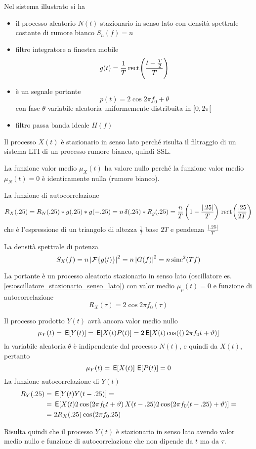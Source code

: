 Nel sistema illustrato si ha
\begin{itemize}
\item il processo aleatorio $N(t)$ stazionario in senso lato con densità spettrale costante di rumore bianco $S_n(f)=n$
\item filtro integratore a finestra mobile
\[g(t)=\frac{1}{T}\,{\operatorname{rect}}^{}\!\left({\frac{t-\frac{T}{2}}{T}}\right)\]
\item è un segnale portante 
\[p(t)=2\cos{2\pi f_0+\theta}\]
con fase $\theta$ variabile aleatoria uniformemente distribuita in $[0,2\pi[$
\item filtro passa banda ideale $H(f)$
\end{itemize}

Il processo $X(t)$ è stazionario in senso lato perché risulta il filtraggio di un sistema LTI di un processo rumore bianco, quindi SSL. 

La funzione valor medio $\mu_X(t)$ ha valore nullo perché la funzione valor medio $\mu_N(t)=0$ è identicamente nulla (rumore bianco).

La funzione di autocorrelazione \[R_X(.25)=R_N(.25)\ast g(.25)\ast g(-.25)=n\operatorname{\delta}(.25)\ast R_g(.25)= \frac{n}{T}\left(1-\frac{\left|{.25}\right|}{T}\right)\,{\operatorname{rect}}^{}\!\left({\frac{.25}{2T}}\right)\]
che è l'espressione di un triangolo di altezza $\frac{1}{T}$ base $2T$ e pendenza $\frac{\left|{.25}\right|}{T}$

La densità spettrale di potenza
\[S_X(f)=n \left|{\operatorname{\mathcal{F}}\!\left\lbrace{g(t)}\right\rbrace}\right|^2=n\left|{G(f)}\right|^2=n\operatorname{sinc}^2(T f)\]

La portante è un processo aleatorio stazionario in senso lato (oscillatore es.\ref{es:oscillatore_stazionario_senso_lato}) con valor medio $\mu_p(t)=0$ e funzione di autocorrelazione 
\[R_X(\tau)=2\cos{2\pi f_0(\tau)}\]

Il processo prodotto $Y(t)$ avrà ancora valor medio nullo
\[\mu_Y(t)=\,{\operatorname{\mathsf{E}}}\!\left[{Y(t)}\right]=\,{\operatorname{\mathsf{E}}}\!\left[{X(t)P(t)}\right]=2 \,{\operatorname{\mathsf{E}}}\!\left[{X(t)\,{\operatorname{cos}}^{}\!\left({(}\right)2\pi f_0 t+\vartheta)}\right]\]
la variabile aleatoria $\theta$ è indipendente dal processo $N(t)$, e quindi da $X(t)$, pertanto
\[\mu_Y(t)=\,{\operatorname{\mathsf{E}}}\!\left[{X(t)}\right]\,{\operatorname{\mathsf{E}}}\!\left[{P(t)}\right]=0\]
La funzione autocorrelazione di $Y(t)$ 
\[\begin{split}R_Y(.25)&=\,{\operatorname{\mathsf{E}}}\!\left[{Y(t)Y(t-.25)}\right]=\\&=\,{\operatorname{\mathsf{E}}}\!\left[{X(t)2\,{\operatorname{cos}}^{}\!\left({2\pi f_0 t+\vartheta}\right) X(t-.25)2\,{\operatorname{cos}}^{}\!\left({2\pi f_0 (t-.25)+\vartheta}\right)}\right]=\\
&=2 R_X(.25)\,{\operatorname{cos}}^{}\!\left({2\pi f_0.25}\right)\end{split}\]

Risulta quindi che il processo $Y(t)$ è stazionario in senso lato avendo valor medio nullo e funzione di autocorrelazione che non dipende da $t$ ma da $\tau$.

